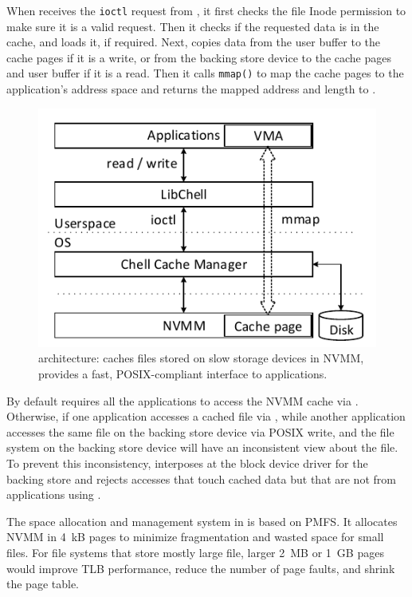 When \drv{} receives the \texttt{ioctl} request from \lib{},
it first checks the
file Inode permission to make sure it is a valid request.  Then it checks if 
the requested data is in the cache,
and loads it, if required.
Next, \drv{} copies data from the user buffer to the cache pages if it is
a write, or from the backing store device to the cache pages and user buffer if 
it is a read. Then it calls \texttt{mmap()} to map the cache pages to
the application's address space and returns the mapped address and length
to \lib{}.


\begin{figure}
\includegraphics{Figures/Chell-Stack.pdf}
\caption{\CChell{} architecture: \CChell{} caches files stored on slow storage
devices in NVMM, provides a fast, POSIX-compliant interface to applications.}
\label{fig:CChellstack}
\end{figure}

By default \CChell{} requires all the applications to access the NVMM cache via
\lib{}.  Otherwise, if one application accesses a cached file via \CChell{}, while another
application accesses the same file on the backing store device via POSIX write,
\CChell{} and the file system on the backing store device will have an
inconsistent view about the file.  To prevent this inconsistency, \drv{}
interposes at the block device driver for the backing store and rejects
accesses that touch cached data but that are not from applications using \lib{}.


The space allocation and management system in \drv{} is based on PMFS.  It
allocates NVMM in 4~kB pages to minimize fragmentation and wasted space for
small files.  For file systems that store mostly large file, larger 2~MB or
1~GB pages would improve
TLB performance, reduce the number of page faults, and shrink the page table.

